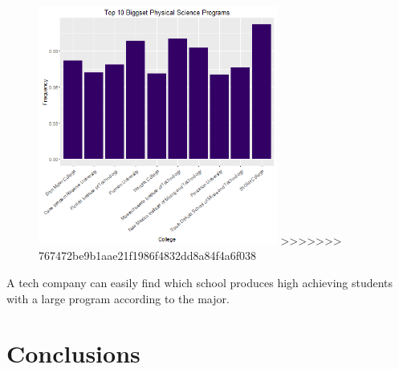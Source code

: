 \documentclass{article}
\begin{document}
\begin{figure}[H]
\includegraphics[width=0.7\textwidth]{../images/biggestPhysical.png}
>>>>>>> 767472be9b1aae21f1986f4832dd8a84f4a6f038
\end{figure}


A tech company can easily find which school produces high achieving students with a large program according to the major. 

\clearpage

\section{Conclusions}
\end{document}
